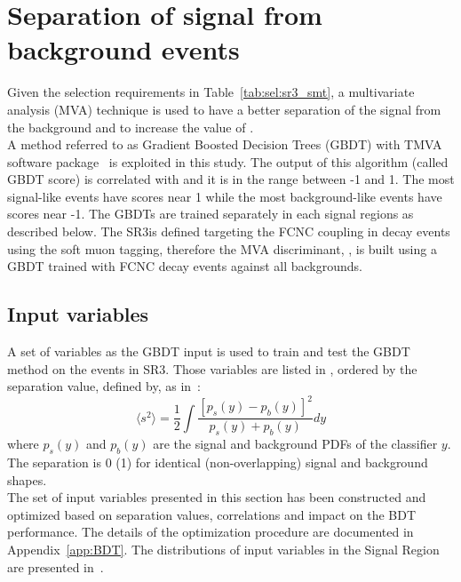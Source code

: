 \section{Separation of signal from background events}
\label{sec:separation}
Given the selection requirements in Table~\ref{tab:sel:sr3_smt}, a multivariate analysis (MVA) technique is used to have a better separation of the signal from the background and to increase the value of \ssplusb.\\ 
A method referred to as Gradient Boosted Decision Trees (GBDT) with TMVA software package~\cite{BDTG,TMVA} is exploited in this study. 
The output of this algorithm (called GBDT score) is correlated with \ssplusb and it is in the range between -1 and 1.
The most signal-like events have scores near 1 while the most background-like events have scores near -1. The GBDTs are trained separately in each signal regions as described below.
The SR3\tZc is defined targeting the FCNC \tZc coupling in \ttbar decay events
using the soft muon tagging, therefore the MVA discriminant, \Dthree, is built using a GBDT trained with FCNC \tZc \ttbar decay events against all backgrounds.

\subsection {Input variables}
\label{sec:input_var}
A set of variables as the GBDT input is used to train and test the GBDT method on the events in SR3\tZc. Those variables are listed in , ordered by the separation value, defined by, as in~\cite{TMVA}:
\begin{equation*}
\langle s^{2}\rangle = \frac{1}{2}\int \frac{[p_{s}(y)-p_{b}(y)]^{2}}{p_{s}(y)+p_{b}(y)}dy
\end{equation*}
where $p_{s}(y)$ and $p_{b}(y)$ are the signal and background PDFs of the classifier $y$. 
The separation is 0 (1) for identical (non-overlapping) signal and background shapes.\\
The set of input variables presented in this section has been constructed and optimized based on separation values, correlations and impact on the BDT performance. The details of the optimization procedure are documented in Appendix~\ref{app:BDT}.  
The distributions of input variables in the Signal Region are presented in~.

